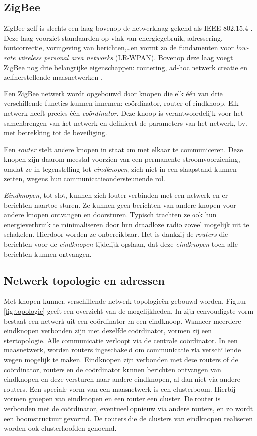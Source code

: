 \subsection{ZigBee}
\label{subsection:zigbee}

ZigBee zelf is slechts een laag bovenop de netwerklaag gekend als IEEE 802.15.4
\citep{ieee2009802.15.4}. Deze laag voorziet standaarden op vlak van
energiegebruik, adressering, foutcorrectie, vormgeving van berichten,\dots en
vormt zo de fundamenten voor \emph{low-rate wireless personal area networks}
(LR-WPAN). Bovenop deze laag voegt ZigBee nog drie belangrijke eigenschappen:
routering, ad-hoc netwerk creatie en zelfherstellende maasnetwerken
\citep{oreilly2010buildingwsn}.

Een ZigBee netwerk wordt opgebouwd door knopen die elk \'e\'en van drie
verschillende functies kunnen innemen: co\"ordinator, router of eindknoop. Elk
netwerk heeft precies \'e\'en \emph{co\"ordinator}. Deze knoop is
verantwoordelijk voor het samenbrengen van het netwerk en definieert de
parameters van het netwerk, bv. met betrekking tot de beveiliging.

Een \emph{router} stelt andere knopen in staat om met elkaar te communiceren.
Deze knopen zijn daarom meestal voorzien van een permanente stroomvoorziening,
omdat ze in tegenstelling tot \emph{eindknopen}, zich niet in een slaapstand
kunnen zetten, wegens hun communicatieondersteunende rol.

\emph{Eindknopen}, tot slot, kunnen zich louter verbinden met een netwerk en er
berichten naartoe sturen. Ze kunnen geen berichten van andere knopen voor
andere knopen ontvangen en doorsturen. Typisch trachten ze ook hun
energieverbruik te minimaliseren door hun draadloze radio zoveel mogelijk uit
te schakelen. Hierdoor worden ze onbereikbaar. Het is dankzij de \emph{routers}
die berichten voor de \emph{eindknopen} tijdelijk opslaan, dat deze
\emph{eindknopen} toch alle berichten kunnen ontvangen.

\subsection{Netwerk topologie en adressen}
\label{subsection:topologie}

Met knopen kunnen verschillende netwerk topologie\"en gebouwd worden. Figuur
\ref{fig:topologie} geeft een overzicht van de mogelijkheden. In zijn
eenvoudigste vorm bestaat een netwerk uit een co\"ordinator en een eindknoop.
Wanneer meerdere eindknopen verbonden zijn met dezelfde co\"ordinator, vormen
zij een stertopologie. Alle communicatie verloopt via de centrale
co\"ordinator. In een maasnetwerk, worden routers ingeschakeld om communicatie
via verschillende wegen mogelijk te maken. Eindknopen zijn verbonden met deze
routers of de co\"ordinator, routers en de co\"ordinator kunnen berichten
ontvangen van eindknopen en deze versturen naar andere eindknopen, al dan niet
via andere routers. Een speciale vorm van een maasnetwerk is een clusterboom.
Hierbij vormen groepen van eindknopen en een router een cluster. De router is
verbonden met de co\"ordinator, eventueel opnieuw via andere routers, en zo
wordt een boomstructuur gevormd. De routers die de clusters van eindknopen
realiseren worden ook clusterhoofden genoemd.

